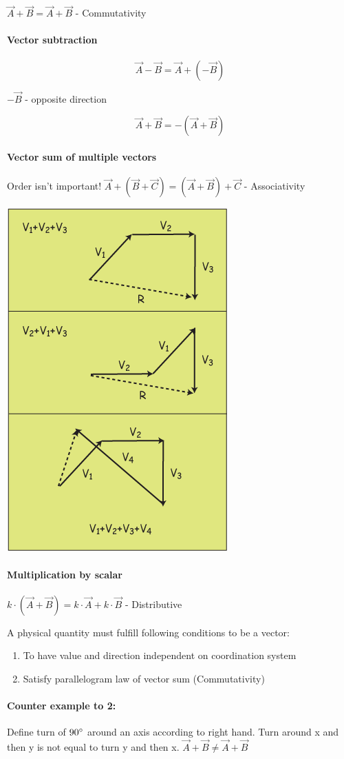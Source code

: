 $\vec{A}+\vec{B}=\vec{A}+\vec{B}$ - Commutativity

\paragraph{Vector subtraction}

$$\vec{A}-\vec{B}=\vec{A}+(-\vec{B})$$

$-\vec{B}$ - opposite direction

$$\vec{A}+\vec{B}=-(\vec{A}+\vec{B})$$
\paragraph{Vector sum of multiple vectors} Order isn't important!
$\vec{A}+(\vec{B}+\vec{C})=(\vec{A}+\vec{B})+\vec{C}$ - Associativity

\begin{center}
	\includegraphics[width=0.3\linewidth]{./lect1/pic2.png}
\end{center}
\paragraph{Multiplication by scalar}
$k \cdot (\vec{A}+\vec{B})=k\cdot\vec{A}+k\cdot\vec{B}$ - Distributive

A physical quantity must fulfill following conditions to be a vector: 
\begin{enumerate}
	\item To have value and direction independent on coordination system
	\item Satisfy parallelogram law of vector sum (Commutativity)
\end{enumerate}

\paragraph{Counter example to 2:}
Define turn of $90\degree$ around an axis according to right hand.
Turn around x and then y is not equal to turn y and then x. 
$\vec{A}+\vec{B}\neq\vec{A}+\vec{B}$
